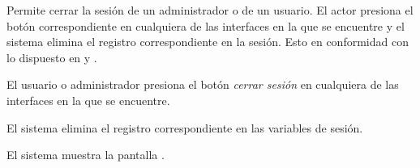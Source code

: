 %
%

{
  Permite cerrar la sesión de un administrador o de un usuario. El actor
  presiona el botón correspondiente en cualquiera de las interfaces en
  la que se encuentre y el sistema elimina el registro correspondiente
  en la sesión. Esto en conformidad con lo dispuesto en
   y
  .

  \begin{trayectoriaPrincipal}

    \item El usuario o administrador presiona el botón \textit{cerrar sesión}
      en cualquiera de las interfaces en la que se encuentre.

    \item El sistema elimina el registro correspondiente en las variables
      de sesión.

    \item El sistema muestra la pantalla
      .

  \end{trayectoriaPrincipal}
}
